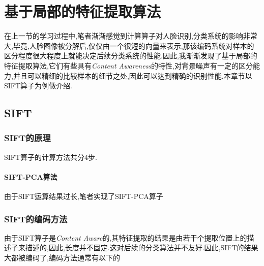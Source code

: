 \chapter{基于局部的特征提取算法}
在上一节的学习过程中,笔者渐渐感觉到计算算子对人脸识别,分类系统的影响非常大,毕竟,人脸图像被分解后,仅仅由一个很短的向量来表示,那该编码系统对样本的区分程度很大程度上就能决定后续分类系统的性能.因此,我渐渐发现了基于局部的特征提取算法,它们有些具有\textit{Content Awareness}的特性,对背景噪声有一定的区分能力,并且可以精细的比较样本的细节之处,因此可以达到精确的识别性能.本章节以SIFT算子为例做介绍.
\section{SIFT}
\subsection{SIFT的原理}
SIFT算子的计算方法共分4步.

\subsubsection{SIFT-PCA算法}
由于SIFT运算结果过长,笔者实现了SIFT-PCA算子

\subsection{SIFT的编码方法}
由于SIFT算子是\textit{Content Aware}的,其特征提取的结果是由若干个提取位置上的描述子来描述的,因此,长度并不固定.这对后续的分类算法并不友好.因此,SIFT的结果大都被编码了,编码方法通常有以下的